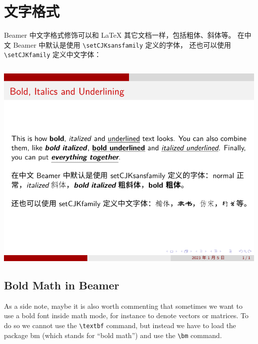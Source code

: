 \section{文字格式}

Beamer 中文字格式修饰可以和 {\LaTeX} 其它文档一样，包括粗体、斜体等。
在中文 Beamer 中默认是使用 \verb|\setCJKsansfamily| 定义的字体，
还也可以使用 \verb|\setCJKfamily| 定义中文字体：

\inputminted[linenos=true]{latex}{examples/beamer/text-bold-italic-underline.tex}

\includegraphics{examples/beamer/text-bold-italic-underline.pdf}

\subsection{Bold Math in Beamer}

As a side note, maybe it is also worth commenting that sometimes we want to use a bold font inside math mode, for instance to denote vectors or matrices. To do so we cannot use the \verb|\textbf| command, but instead we have to load the package bm (which stands for “bold math”) and use the \verb|\bm| command.

\inputminted[linenos=true]{latex}{examples/beamer/text-bold-math.tex}

